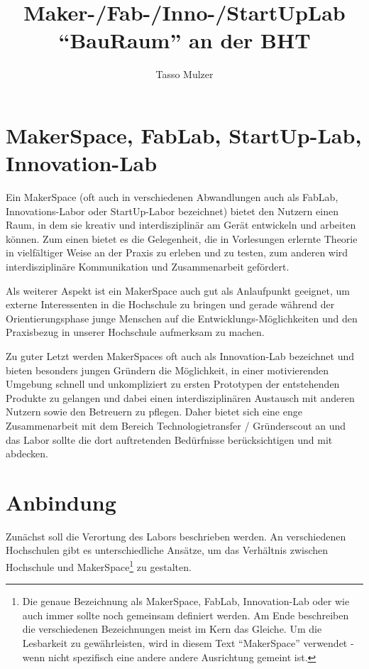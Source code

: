 \documentclass[parskip=half,headsepline,footsepline,titlepage]{scrartcl}
\title{Maker-/Fab-/Inno-/StartUpLab ``BauRaum'' an der BHT}
\author{Tasso Mulzer}
\begin{document}
 
\maketitle
\doclicenseThis

\pagestyle{empty}
\tableofcontents
\cleardoubleoddpage

\pagestyle{plain}

\section{MakerSpace, FabLab, StartUp-Lab, Innovation-Lab}
Ein MakerSpace (oft auch in verschiedenen Abwandlungen auch als FabLab, Innovations-Labor oder StartUp-Labor bezeichnet) bietet den Nutzern einen Raum, in dem sie kreativ und interdisziplinär am Gerät entwickeln und arbeiten können.
Zum einen bietet es die Gelegenheit, die in Vorlesungen erlernte Theorie in vielfältiger Weise an der Praxis zu erleben und zu testen, zum anderen wird interdisziplinäre Kommunikation und Zusammenarbeit gefördert.

Als weiterer Aspekt ist ein MakerSpace auch gut als Anlaufpunkt geeignet, um externe Interessenten in die Hochschule zu bringen und gerade während der Orientierungsphase junge Menschen auf die Entwicklungs-Möglichkeiten und den Praxisbezug in unserer Hochschule aufmerksam zu machen.

Zu guter Letzt werden MakerSpaces oft auch als Innovation-Lab bezeichnet und bieten besonders jungen Gründern die Möglichkeit, in einer motivierenden Umgebung schnell und unkompliziert zu ersten Prototypen der entstehenden Produkte zu gelangen und dabei einen interdisziplinären Austausch mit anderen Nutzern sowie den Betreuern zu pflegen. Daher bietet sich eine enge Zusammenarbeit mit dem Bereich Technologietransfer / Gründerscout an und das Labor sollte die dort auftretenden Bedürfnisse berücksichtigen und mit abdecken.


\section{Anbindung}
Zunächst soll die Verortung des Labors beschrieben werden. An verschiedenen Hochschulen gibt es unterschiedliche Ansätze, um das Verhältnis zwischen Hochschule und MakerSpace\footnote{Die genaue Bezeichnung als MakerSpace, FabLab, Innovation-Lab oder wie auch immer sollte noch gemeinsam definiert werden. Am Ende beschreiben die verschiedenen Bezeichnungen meist im Kern das Gleiche. Um die Lesbarkeit zu gewährleisten, wird in diesem Text ``MakerSpace'' verwendet - wenn nicht spezifisch eine andere andere Ausrichtung gemeint ist.} zu gestalten.
\end{document}
